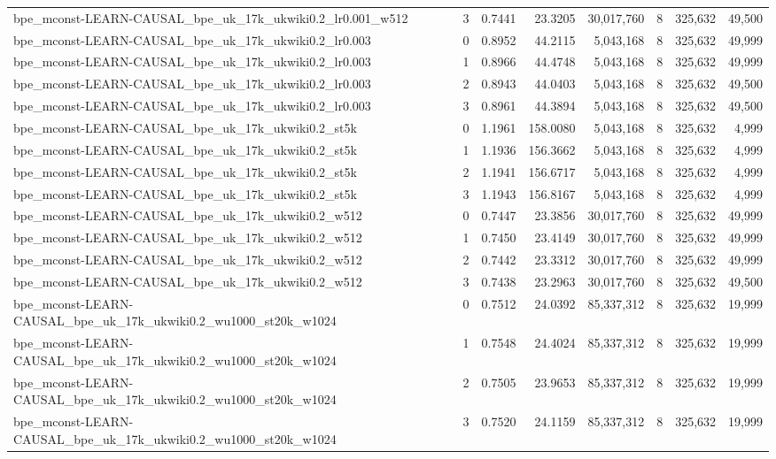 \begin{tabular}{lrrrrrrr}
bpe\_mconst-LEARN-CAUSAL\_bpe\_uk\_17k\_ukwiki0.2\_lr0.001\_w512 & 3 & 0.7441 & 23.3205 & 30,017,760 & 8 & 325,632 & 49,500 \\
bpe\_mconst-LEARN-CAUSAL\_bpe\_uk\_17k\_ukwiki0.2\_lr0.003 & 0 & 0.8952 & 44.2115 & 5,043,168 & 8 & 325,632 & 49,999 \\
bpe\_mconst-LEARN-CAUSAL\_bpe\_uk\_17k\_ukwiki0.2\_lr0.003 & 1 & 0.8966 & 44.4748 & 5,043,168 & 8 & 325,632 & 49,999 \\
bpe\_mconst-LEARN-CAUSAL\_bpe\_uk\_17k\_ukwiki0.2\_lr0.003 & 2 & 0.8943 & 44.0403 & 5,043,168 & 8 & 325,632 & 49,500 \\
bpe\_mconst-LEARN-CAUSAL\_bpe\_uk\_17k\_ukwiki0.2\_lr0.003 & 3 & 0.8961 & 44.3894 & 5,043,168 & 8 & 325,632 & 49,500 \\
bpe\_mconst-LEARN-CAUSAL\_bpe\_uk\_17k\_ukwiki0.2\_st5k & 0 & 1.1961 & 158.0080 & 5,043,168 & 8 & 325,632 & 4,999 \\
bpe\_mconst-LEARN-CAUSAL\_bpe\_uk\_17k\_ukwiki0.2\_st5k & 1 & 1.1936 & 156.3662 & 5,043,168 & 8 & 325,632 & 4,999 \\
bpe\_mconst-LEARN-CAUSAL\_bpe\_uk\_17k\_ukwiki0.2\_st5k & 2 & 1.1941 & 156.6717 & 5,043,168 & 8 & 325,632 & 4,999 \\
bpe\_mconst-LEARN-CAUSAL\_bpe\_uk\_17k\_ukwiki0.2\_st5k & 3 & 1.1943 & 156.8167 & 5,043,168 & 8 & 325,632 & 4,999 \\
bpe\_mconst-LEARN-CAUSAL\_bpe\_uk\_17k\_ukwiki0.2\_w512 & 0 & 0.7447 & 23.3856 & 30,017,760 & 8 & 325,632 & 49,999 \\
bpe\_mconst-LEARN-CAUSAL\_bpe\_uk\_17k\_ukwiki0.2\_w512 & 1 & 0.7450 & 23.4149 & 30,017,760 & 8 & 325,632 & 49,999 \\
bpe\_mconst-LEARN-CAUSAL\_bpe\_uk\_17k\_ukwiki0.2\_w512 & 2 & 0.7442 & 23.3312 & 30,017,760 & 8 & 325,632 & 49,999 \\
bpe\_mconst-LEARN-CAUSAL\_bpe\_uk\_17k\_ukwiki0.2\_w512 & 3 & 0.7438 & 23.2963 & 30,017,760 & 8 & 325,632 & 49,500 \\
bpe\_mconst-LEARN-CAUSAL\_bpe\_uk\_17k\_ukwiki0.2\_wu1000\_st20k\_w1024 & 0 & 0.7512 & 24.0392 & 85,337,312 & 8 & 325,632 & 19,999 \\
bpe\_mconst-LEARN-CAUSAL\_bpe\_uk\_17k\_ukwiki0.2\_wu1000\_st20k\_w1024 & 1 & 0.7548 & 24.4024 & 85,337,312 & 8 & 325,632 & 19,999 \\
bpe\_mconst-LEARN-CAUSAL\_bpe\_uk\_17k\_ukwiki0.2\_wu1000\_st20k\_w1024 & 2 & 0.7505 & 23.9653 & 85,337,312 & 8 & 325,632 & 19,999 \\
bpe\_mconst-LEARN-CAUSAL\_bpe\_uk\_17k\_ukwiki0.2\_wu1000\_st20k\_w1024 & 3 & 0.7520 & 24.1159 & 85,337,312 & 8 & 325,632 & 19,999 \\

\end{tabular}
